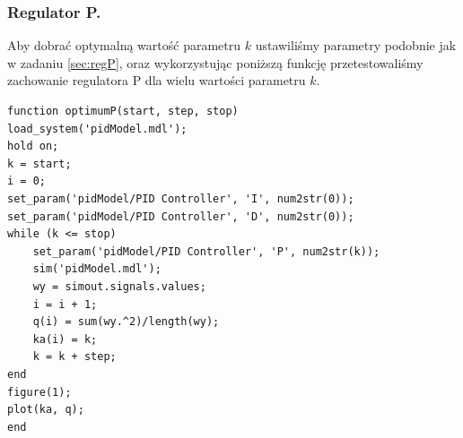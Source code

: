 \documentclass[a4paper,10pt]{article}
\begin{document}
\subsubsection{Regulator P.}\label{sec:optP}
Aby dobrać optymalną wartość parametru $k$ ustawiliśmy parametry podobnie jak w zadaniu \ref{sec:regP}, oraz wykorzystując poniższą funkcję przetestowaliśmy zachowanie regulatora P dla wielu wartości parametru $k$. \\
\begin{lstlisting}[caption=Funkcja testująca regulator P.]
function optimumP(start, step, stop)
load_system('pidModel.mdl');
hold on;
k = start;
i = 0;
set_param('pidModel/PID Controller', 'I', num2str(0));
set_param('pidModel/PID Controller', 'D', num2str(0));
while (k <= stop)
	set_param('pidModel/PID Controller', 'P', num2str(k));
	sim('pidModel.mdl');
	wy = simout.signals.values;
	i = i + 1;
	q(i) = sum(wy.^2)/length(wy);
	ka(i) = k;
	k = k + step;
end
figure(1);
plot(ka, q);
end
\end{lstlisting}
\end{document}
